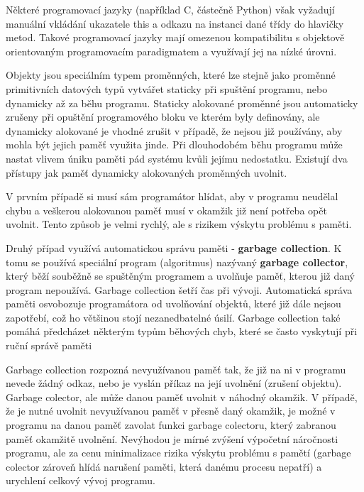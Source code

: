Některé programovací jazyky (například C, částečně Python) však vyžadují manuální vkládání ukazatele this a odkazu na instanci dané třídy do hlavičky metod. Takové programovací jazyky mají omezenou kompatibilitu s objektově orientovaným programovacím paradigmatem a využívají jej na nízké úrovni.




Objekty jsou speciálním typem proměnných, které lze stejně jako proměnné primitivních datových typů vytvářet staticky při spuštění programu, nebo dynamicky až za běhu programu. Staticky alokované proměnné jsou automaticky zrušeny při opuštění programového bloku ve kterém byly definovány, ale dynamicky alokované je vhodné zrušit v případě, že nejsou již používány, aby mohla být jejich paměť využita jinde. Při dlouhodobém běhu programu může nastat vlivem úniku paměti pád systému kvůli jejímu nedostatku. Existují dva přístupy jak paměť dynamicky alokovaných proměnných uvolnit. 

V prvním případě si musí sám programátor hlídat, aby v programu neudělal chybu a veškerou alokovanou paměť musí v okamžik již není potřeba opět uvolnit. Tento způsob je velmi rychlý, ale s rizikem výskytu problému s paměti.

Druhý případ využívá automatickou správu paměti - {\bf garbage collection}. K tomu se používá speciální program (algoritmus) nazývaný {\bf garbage collector}, který běží souběžně se spuštěným programem a uvolňuje paměť, kterou již daný program nepoužívá. Garbage collection šetří čas při vývoji. Automatická správa paměti osvobozuje programátora od uvolňování objektů, které již dále nejsou zapotřebí, což ho většinou stojí nezanedbatelné úsilí. Garbage collection také pomáhá předcházet některým typům běhových chyb, které se často vyskytují při ruční správě paměti 


Garbage collection rozpozná nevyužívanou paměť tak, že již na ni v programu nevede žádný odkaz, nebo je vyslán příkaz na její uvolnění (zrušení objektu). Garbage colector, ale může danou paměť uvolnit v náhodný okamžik. V případě, že je nutné uvolnit nevyužívanou paměť v přesně daný okamžik, je možné v programu na danou paměť zavolat funkci garbage colectoru, který zabranou paměť okamžitě uvolnění. Nevýhodou je mírné zvýšení výpočetní náročnosti programu, ale za cenu minimalizace rizika výskytu problému s pamětí (garbage colector zároveň hlídá narušení paměti, která danému procesu nepatří) a urychlení celkový vývoj programu.


